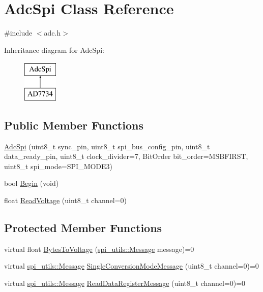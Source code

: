 \hypertarget{classAdcSpi}{}\section{Adc\+Spi Class Reference}
\label{classAdcSpi}


{\ttfamily \#include $<$adc.\+h$>$}

Inheritance diagram for Adc\+Spi\+:\begin{figure}[H]
\begin{center}
\leavevmode
\includegraphics[height=2.000000cm]{classAdcSpi}
\end{center}
\end{figure}
\subsection*{Public Member Functions}
\begin{DoxyCompactItemize}
\item 
\mbox{\hyperlink{classAdcSpi_a5b3afab7dc4a788e1caf6a1277b67df9}{Adc\+Spi}} (uint8\+\_\+t sync\+\_\+pin, uint8\+\_\+t spi\+\_\+bus\+\_\+config\+\_\+pin, uint8\+\_\+t data\+\_\+ready\+\_\+pin, uint8\+\_\+t clock\+\_\+divider=7, Bit\+Order bit\+\_\+order=M\+S\+B\+F\+I\+R\+ST, uint8\+\_\+t spi\+\_\+mode=S\+P\+I\+\_\+\+M\+O\+D\+E3)
\item 
bool \mbox{\hyperlink{classAdcSpi_aa8f8f27578dd85cfcdbc9439bbce66cb}{Begin}} (void)
\item 
float \mbox{\hyperlink{classAdcSpi_aa245df90e70654aabc64f88107ccd804}{Read\+Voltage}} (uint8\+\_\+t channel=0)
\end{DoxyCompactItemize}
\subsection*{Protected Member Functions}
\begin{DoxyCompactItemize}
\item 
virtual float \mbox{\hyperlink{classAdcSpi_a778d7c86b37cebe4444ec5284f2ea9b7}{Bytes\+To\+Voltage}} (\mbox{\hyperlink{structspi__utils_1_1Message}{spi\+\_\+utils\+::\+Message}} message)=0
\item 
virtual \mbox{\hyperlink{structspi__utils_1_1Message}{spi\+\_\+utils\+::\+Message}} \mbox{\hyperlink{classAdcSpi_a369da36232861640a113792d2398ce44}{Single\+Conversion\+Mode\+Message}} (uint8\+\_\+t channel=0)=0
\item 
virtual \mbox{\hyperlink{structspi__utils_1_1Message}{spi\+\_\+utils\+::\+Message}} \mbox{\hyperlink{classAdcSpi_a3578f18e1976d9e2b075a3fbdc003517}{Read\+Data\+Register\+Message}} (uint8\+\_\+t channel=0)=0
\end{DoxyCompactItemize}


